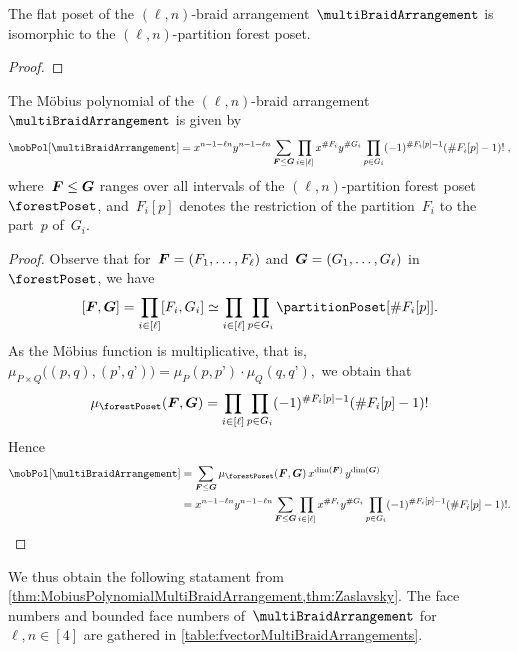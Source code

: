 \begin{proposition}
\label{prop:flatPosetMultiBraidArrangement}
The flat poset of the $(\ell,n)$-braid arrangement~$\multiBraidArrangement$ is isomorphic to the $(\ell,n)$-partition forest poset.
\end{proposition}

\begin{proof}
\end{proof}

\begin{theorem}
\label{thm:MobiusPolynomialMultiBraidArrangement}
The M\"obius polynomial of the $(\ell,n)$-braid arrangement~$\multiBraidArrangement$ is given by
\[
\mobPol[\multiBraidArrangement] = x^{n-1-\ell n} y^{n-1-\ell n} \sum_{\b{F} \le \b{G}} \prod_{i \in [\ell]} x^{\#F_i} y^{\#G_i} \prod_{p \in G_i} (-1)^{\#F_i[p]-1} (\# F_i[p]-1)! \; ,
\]
where~$\boldsymbol{F} \le \boldsymbol{G}$ ranges over all intervals of the $(\ell,n)$-partition forest poset~$\forestPoset$, and~$F_i[p]$ denotes the restriction of the partition~$F_i$ to the part~$p$ of~$G_i$.
\end{theorem}

\begin{proof}
Observe that for~$\boldsymbol{F} = (F_1, \dots, F_\ell)$ and~$\boldsymbol{G} = (G_1, \dots, G_\ell)$ in~$\forestPoset$, we have
\[
[\b{F}, \b{G}] = \prod_{i \in [\ell]} [F_i, G_i] \simeq \prod_{i \in [\ell]} \prod_{p \in G_i} \partitionPoset[{\#F_i[p]}].
\]
As the M\"obius function is multiplicative, that is,
\(
\mu_{P \times Q} \big( (p,q), (p’,q’) \big) = \mu_P(p,p’) \cdot \mu_Q(q,q’),
\)
we obtain that
\[
\mu_{\forestPoset}(\b{F}, \b{G}) = \prod_{i \in [\ell]} \prod_{p \in G_i} (-1)^{\#F_i[p]-1} (\# F_i[p]-1)!
\]
Hence
\begin{align*}
\mobPol[\multiBraidArrangement] 
& = \sum_{\b{F} \le \b{G}} \mu_{\forestPoset}(\b{F}, \b{G}) \, x^{\dim(\b{F})} \, y^{\dim(\b{G})} \\
& = x^{n-1-\ell n} y^{n-1-\ell n} \sum_{\b{F} \le \b{G}} \prod_{i \in [\ell]} x^{\#F_i} y^{\#G_i} \prod_{p \in G_i} (-1)^{\#F_i[p]-1} (\# F_i[p]-1)!.
\qedhere
\end{align*}
\end{proof}

We thus obtain the following statament from \cref{thm:MobiusPolynomialMultiBraidArrangement,thm:Zaslavsky}.
The face numbers and bounded face numbers of~$\multiBraidArrangement$ for~$\ell, n \in [4]$ are gathered in \cref{table:fvectorMultiBraidArrangements}.


